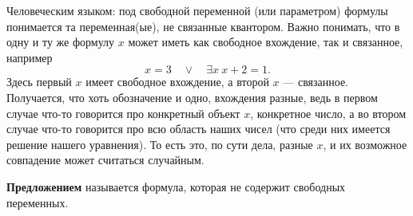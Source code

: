 \documentclass[a4paper, fleqn]{article}
\begin{document}
    Человеческим языком: под свободной переменной (или параметром) формулы понимается та переменная(ые),
    не связанные квантором. Важно понимать, что в одну и ту же формулу $x$ может иметь как свободное 
    вхождение, так и связанное, например
    \[
        x = 3 \quad \lor \quad \exists x~x + 2 = 1.
    \]
    Здесь первый $x$ имеет свободное вхождение, а второй $x$ --- связанное.
    Получается, что хоть обозначение и одно, вхождения разные, ведь в первом случае что-то говорится 
    про конкретный объект $x$, конкретное число, а во втором случае что-то говорится про всю область 
    наших чисел (что среди них имеется решение нашего уравнения).
    То есть это, по сути дела, разные $x$, и их возможное совпадение может считаться случайным.

    \begin{definition}
        \textbf{Предложением} называется формула, которая не содержит свободных переменных.
    \end{definition}
\end{document}
